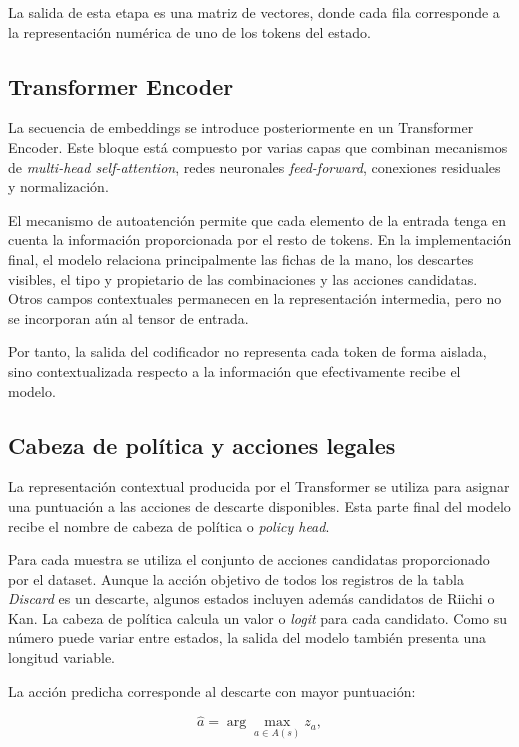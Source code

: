 La salida de esta etapa es una matriz de vectores, donde cada fila corresponde a la representación numérica de uno de los tokens del estado.

\subsection{Transformer Encoder}

La secuencia de embeddings se introduce posteriormente en un Transformer Encoder. Este bloque está compuesto por varias capas que combinan mecanismos de \textit{multi-head self-attention}, redes neuronales \textit{feed-forward}, conexiones residuales y normalización.

El mecanismo de autoatención permite que cada elemento de la entrada tenga en cuenta la información proporcionada por el resto de tokens. En la implementación final, el modelo relaciona principalmente las fichas de la mano, los descartes visibles, el tipo y propietario de las combinaciones y las acciones candidatas. Otros campos contextuales permanecen en la representación intermedia, pero no se incorporan aún al tensor de entrada.

Por tanto, la salida del codificador no representa cada token de forma aislada, sino contextualizada respecto a la información que efectivamente recibe el modelo.

\subsection{Cabeza de política y acciones legales}

La representación contextual producida por el Transformer se utiliza para asignar una puntuación a las acciones de descarte disponibles. Esta parte final del modelo recibe el nombre de cabeza de política o \textit{policy head}.

Para cada muestra se utiliza el conjunto de acciones candidatas proporcionado por el dataset. Aunque la acción objetivo de todos los registros de la tabla \textit{Discard} es un descarte, algunos estados incluyen además candidatos de Riichi o Kan. La cabeza de política calcula un valor o \textit{logit} para cada candidato. Como su número puede variar entre estados, la salida del modelo también presenta una longitud variable.

La acción predicha corresponde al descarte con mayor puntuación:

\begin{equation}
    \hat{a} = \arg\max_{a \in A(s)} z_a,
\end{equation}

